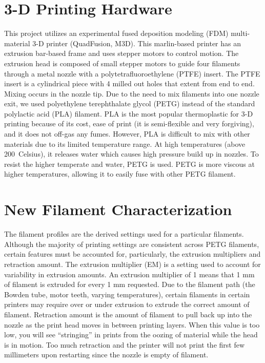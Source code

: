 \section{3-D Printing Hardware}
This project utilizes an experimental fused deposition modeling (FDM) multi-material 3-D printer (QuadFusion, M3D). This marlin-based printer has an extrusion bar-based frame and uses stepper motors to control motion. The extrusion head is composed of small stepper motors to guide four filaments through a metal nozzle with a polytetrafluoroethylene (PTFE) insert. The PTFE insert is a cylindrical piece with 4 milled out holes that extent from end to end. Mixing occurs in the nozzle tip. Due to the need to mix filaments into one nozzle exit, we used polyethylene terephthalate glycol (PETG) instead of the standard polylactic acid (PLA) filament. PLA is the most popular thermoplastic for 3-D printing because of its cost, ease of print (it is semi-flexible and very forgiving), and it does not off-gas any fumes. However, PLA is difficult to mix with other materials due to its limited temperature range. At high temperatures (above 200\textdegree~Celsius), it releases water which causes high pressure build up in nozzles. To resist the higher temperate and water, PETG is used. PETG is more viscous at higher temperatures, allowing it to easily fuse with other PETG filament. 


\section{New Filament Characterization}
The filament profiles are the derived settings used for a particular filaments. Although the majority of printing settings are consistent across PETG filaments, certain features must be accounted for, particularly, the extrusion multipliers and retraction amount. The extrusion multiplier (EM) is a setting used to account for variability in extrusion amounts. An extrusion multiplier of 1 means that 1 mm of filament is extruded for every 1 mm requested. Due to the filament path (the Bowden tube, motor teeth, varying temperatures), certain filaments in certain printers may require over or under extrusion to extrude the correct amount of filament. Retraction amount is the amount of filament to pull back up into the nozzle as the print head moves in between printing layers. When this value is too low, you will see ``stringing'' in prints from the oozing of material while the head is in motion. Too much retraction and the printer will not print the first few millimeters upon restarting since the nozzle is empty of filament.

